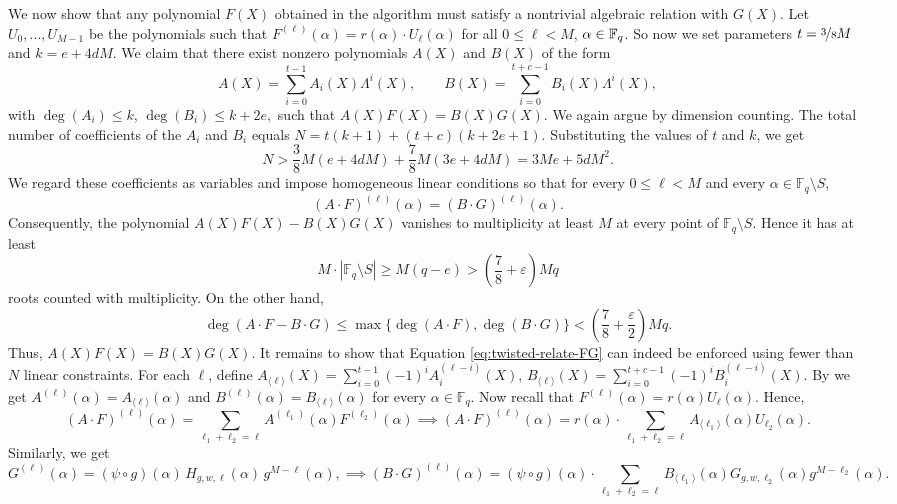 We now show that any polynomial $F(X)$ obtained in the algorithm must satisfy a nontrivial algebraic relation with $G(X)$. Let $U_0,\dots, U_{M-1}$ be the polynomials such that $F^{(\ell)}(\alpha)=r(\alpha)\cdot U_{\ell}(\alpha)$ for all $0\leq \ell<M$, $\alpha\in\mathbb{F}_q$. So now we set parameters $t=\nicefrac38 M$ and $k=e+4dM$.
We claim that there exist nonzero polynomials $A(X)$ and $B(X)$ of the form
\[
  A(X)=\sum_{i=0}^{t-1} A_i(X)\Lambda^i(X),
  \qquad
  B(X)=\sum_{i=0}^{t+c-1} B_i(X)\Lambda^i(X),
\]
with 
\(
\deg(A_i)\le k\), \(
\deg(B_i)\le k+2e,
\)
such that
\(
A(X)F(X)=B(X)G(X).
\) We again argue by dimension counting. The total number of coefficients of the $A_i$ and $B_i$ equals 
\(
N=t(k+1)+(t+c)(k+2e+1).
\) Substituting the values of $t$ and $k$, we get
\begin{equation}\label{eq:FG-relate-num-var}
  N>
  \frac38 M(e+4dM)+\frac78 M(3e+4dM)
  =
  3Me+5dM^2.
\end{equation}
We regard these coefficients as variables and impose homogeneous linear conditions so that for every $0\le \ell<M$ and every $\alpha\in\mathbb F_q\setminus S$,
\begin{equation}\label{eq:twisted-relate-FG}
  (A\cdot F)^{(\ell)}(\alpha) = (B\cdot G)^{(\ell)}(\alpha).
\end{equation}
Consequently, the polynomial $A(X)F(X)-B(X)G(X)$ vanishes to multiplicity at least $M$ at every point of $\mathbb F_q\setminus S$. Hence it has at least $$M\cdot |\mathbb F_q\setminus S|\ge M(q-e)>
  \left(\frac78+\varepsilon\right)Mq$$
roots counted with multiplicity. On the other hand,
\[
  \deg(A\cdot F-B\cdot G)
  \le
  \max\{\deg(A\cdot F),\deg(B\cdot G)\}
  <
  \left(\frac78+\frac{\varepsilon}{2}\right)Mq.
\]
Thus, 
\(
A(X)F(X)=B(X)G(X).
\) It remains to show that Equation \eqref{eq:twisted-relate-FG} can indeed be enforced using fewer than $N$ linear constraints. For each $\ell$, define 
\(
A_{\langle \ell\rangle}(X)
=
\sum_{i=0}^{t-1}
(-1)^i A_i^{(\ell-i)}(X)\), \(
B_{\langle \ell\rangle}(X)
=
\sum_{i=0}^{t+c-1}
(-1)^i B_i^{(\ell-i)}(X).
\) By \DerivativeXqXlem we get 
\(
A^{(\ell)}(\alpha)=A_{\langle \ell\rangle}(\alpha)\) and \(
B^{(\ell)}(\alpha)=B_{\langle \ell\rangle}(\alpha)
\) for every $\alpha\in\mathbb F_q$. Now recall that 
\(
F^{(\ell)}(\alpha)=r(\alpha)U_\ell(\alpha).
\) Hence,
\begin{equation}\label{eq:derivative-of-AF}
  (A\cdot F)^{(\ell)}(\alpha)
  =
  \sum_{\ell_1+\ell_2=\ell}
  A^{(\ell_1)}(\alpha)F^{(\ell_2)}(\alpha)\implies
  (A\cdot F)^{(\ell)}(\alpha)
  =
  r(\alpha)\cdot
  \sum_{\ell_1+\ell_2=\ell}
  A_{\langle \ell_1\rangle}(\alpha)
  U_{\ell_2}(\alpha).
\end{equation}
Similarly, we get
\begin{equation}\label{eq:derivative-of-BG}
  G^{(\ell)}(\alpha)
  =
  (\psi\circ g)(\alpha)\,
  H_{g,w,\ell}(\alpha)\,
  g^{M-\ell}(\alpha),
  \implies
  (B\cdot G)^{(\ell)}(\alpha)
  =
  (\psi\circ g)(\alpha)\cdot
  \sum_{\ell_1+\ell_2=\ell}
  B_{\langle \ell_1\rangle}(\alpha)
  G_{g,w,\ell_2}(\alpha)
  g^{M-\ell_2}(\alpha).
\end{equation}

